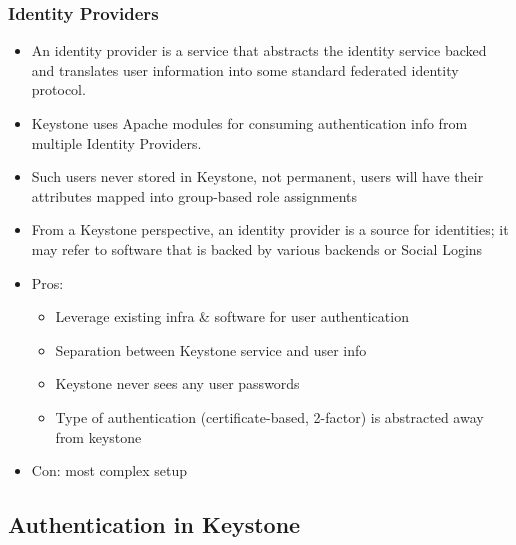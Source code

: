 \documentclass{article}
\begin{document}
\subsubsection{Identity Providers}
\begin{itemize}
    \item An identity provider is a service that abstracts the identity service backed and translates user information into some standard federated identity protocol.
    
    \item Keystone uses Apache modules for consuming authentication info from multiple Identity Providers. 
    
    \item Such users never stored in Keystone, not permanent, users will have their attributes mapped into group-based role assignments
    
    \item From a Keystone perspective, an identity provider is a source for identities; it may refer to software that is backed by various backends or Social Logins
    
    \item Pros:
    \begin{itemize}
        \item Leverage existing infra \& software for user authentication
        
        \item Separation between Keystone service and user info
        
        \item Keystone never sees any user passwords
        
        \item Type of authentication (certificate-based, 2-factor) is abstracted away from keystone
    \end{itemize}
    
    \item Con: most complex setup
\end{itemize}

\subsection{Authentication in Keystone}
\end{document}
